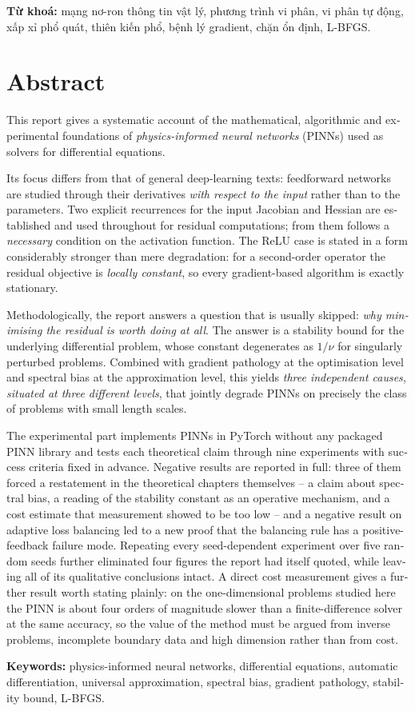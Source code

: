 \bigskip
\noindent\textbf{Từ khoá:} mạng nơ-ron thông tin vật lý, phương trình vi phân,
vi phân tự động, xấp xỉ phổ quát, thiên kiến phổ, bệnh lý gradient, chặn ổn
định, L-BFGS.

\chapter*{Abstract}

\begin{english}
This report gives a systematic account of the mathematical, algorithmic and
experimental foundations of \emph{physics-informed neural networks} (PINNs) used
as solvers for differential equations.

Its focus differs from that of general deep-learning texts: feedforward networks
are studied through their derivatives \emph{with respect to the input} rather
than to the parameters. Two explicit recurrences for the input Jacobian and
Hessian are established and used throughout for residual computations; from them
follows a \emph{necessary} condition on the activation function. The ReLU case is
stated in a form considerably stronger than mere degradation: for a second-order
operator the residual objective is \emph{locally constant}, so every
gradient-based algorithm is exactly stationary.

Methodologically, the report answers a question that is usually skipped: \emph{why
minimising the residual is worth doing at all}. The answer is a stability bound
for the underlying differential problem, whose constant degenerates as $1/\nu$ for
singularly perturbed problems. Combined with gradient pathology at the
optimisation level and spectral bias at the approximation level, this yields
\emph{three independent causes, situated at three different levels}, that jointly
degrade PINNs on precisely the class of problems with small length scales.

The experimental part implements PINNs in PyTorch without any packaged PINN
library and tests each theoretical claim through nine experiments with success
criteria fixed in advance. Negative results are reported in full: three of them
forced a restatement in the theoretical chapters themselves -- a claim about
spectral bias, a reading of the stability constant as an operative mechanism,
and a cost estimate that measurement showed to be too low -- and a negative
result on adaptive loss balancing led to a new proof that the balancing rule has
a positive-feedback failure mode. Repeating every seed-dependent experiment over
five random seeds further eliminated four figures the report had itself quoted,
while leaving all of its qualitative conclusions intact. A
direct cost measurement gives a further result worth stating plainly: on the
one-dimensional problems studied here the PINN is about four orders of magnitude
slower than a finite-difference solver at the same accuracy, so the value of the
method must be argued from inverse problems, incomplete boundary data and high
dimension rather than from cost.

\bigskip
\noindent\textbf{Keywords:} physics-informed neural networks, differential
equations, automatic differentiation, universal approximation, spectral bias,
gradient pathology, stability bound, L-BFGS.
\end{english}
